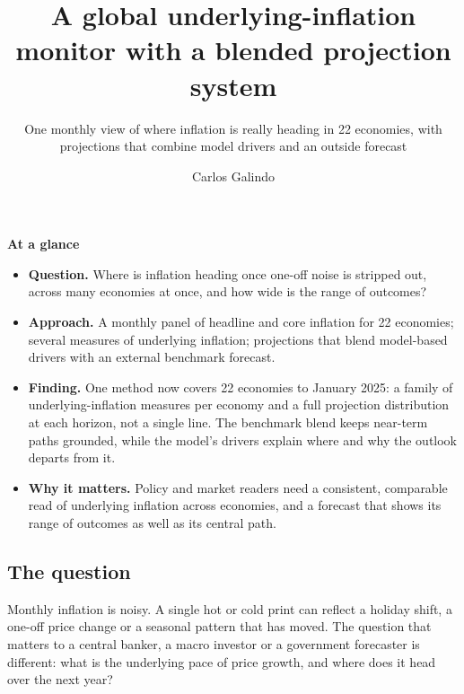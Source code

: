 \documentclass[
  british,
  a4paper,
]{article}
\title{A global underlying-inflation monitor with a blended projection
system}
\subtitle{One monthly view of where inflation is really heading in 22
economies, with projections that combine model drivers and an outside
forecast}
\author{Carlos Galindo}
\date{}
\providecommand{\tightlist}{%
  \setlength{\itemsep}{0pt}\setlength{\parskip}{0pt}}
\begin{document}
\maketitle


\begin{tcolorbox}[enhanced jigsaw, arc=.35mm, bottomrule=.15mm, breakable, colback=white, colframe=quarto-callout-note-color-frame, left=2mm, leftrule=.75mm, opacityback=0, rightrule=.15mm, toprule=.15mm]

\vspace{-3mm}\textbf{At a glance}\vspace{3mm}

\begin{itemize}
\tightlist
\item
  \textbf{Question.} Where is inflation heading once one-off noise is
  stripped out, across many economies at once, and how wide is the range
  of outcomes?
\item
  \textbf{Approach.} A monthly panel of headline and core inflation for
  22 economies; several measures of underlying inflation; projections
  that blend model-based drivers with an external benchmark forecast.
\item
  \textbf{Finding.} One method now covers 22 economies to January 2025:
  a family of underlying-inflation measures per economy and a full
  projection distribution at each horizon, not a single line. The
  benchmark blend keeps near-term paths grounded, while the model's
  drivers explain where and why the outlook departs from it.
\item
  \textbf{Why it matters.} Policy and market readers need a consistent,
  comparable read of underlying inflation across economies, and a
  forecast that shows its range of outcomes as well as its central path.
\end{itemize}

\end{tcolorbox}

\subsection{The question}\label{the-question}

Monthly inflation is noisy. A single hot or cold print can reflect a
holiday shift, a one-off price change or a seasonal pattern that has
moved. The question that matters to a central banker, a macro investor
or a government forecaster is different: what is the underlying pace of
price growth, and where does it head over the next year?
\end{document}

